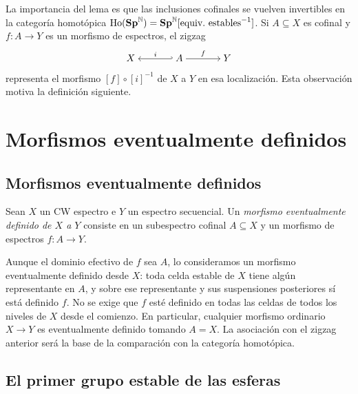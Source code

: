 La importancia del lema es que las inclusiones cofinales se vuelven invertibles en la categoría homotópica $\operatorname{Ho}(\mathbf{Sp}^{\mathbb N})=\mathbf{Sp}^{\mathbb N}[\text{equiv.\ estables}^{-1}]$. Si $A\subseteq X$ es cofinal y $f\colon A\to Y$ es un morfismo de espectros, el zigzag
\[
\begin{tikzcd}[cramped,column sep=large]
X & A \arrow[l,hook',"i"'] \arrow[r,"f"] & Y
\end{tikzcd}
\]
representa el morfismo $[f]\circ[i]^{-1}$ de $X$ a $Y$ en esa localización. Esta observación motiva la definición siguiente.

\section{Morfismos eventualmente definidos}

\subsection{Morfismos eventualmente definidos}

\begin{defi}\label{defi:c11-morfismo-eventual}
Sean $X$ un CW espectro e $Y$ un espectro secuencial. Un \emph{morfismo eventualmente definido de $X$ a $Y$} consiste en un subespectro cofinal $A\subseteq X$ y un morfismo de espectros $f\colon A\to Y$.
\end{defi}

Aunque el dominio efectivo de $f$ sea $A$, lo consideramos un morfismo eventualmente definido desde $X$: toda celda estable de $X$ tiene algún representante en $A$, y sobre ese representante y sus suspensiones posteriores sí está definido $f$. No se exige que $f$ esté definido en todas las celdas de todos los niveles de $X$ desde el comienzo. En particular, cualquier morfismo ordinario $X\to Y$ es eventualmente definido tomando $A=X$. La asociación con el zigzag anterior será la base de la comparación con la categoría homotópica.

\subsection{El primer grupo estable de las esferas}


